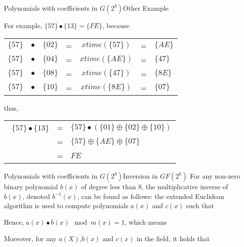 \begin{frame}[t]{Polynomials with coefficients in $G(2^8)$}{Other Example}
	
	For example, $\{57\} \bullet \{13\} = \{FE\}$, because 
	\medskip
	
	
	\begin{center}
		\small
		\begin{tabular}{ccccccl}
			
			$\{57\}$ & $\bullet$ & $\{02\}$ & = &  $xtime(\{57\})$ & = & $\{AE\}$ \\
			$\{57\}$ & $\bullet$ & $\{04\}$ & = &  $xtime(\{AE\})$ & = & $\{47\}$ \\
			$\{57\}$ & $\bullet$ & $\{08\}$ & = &  $xtime(\{47\})$ & = & $\{8E\}$ \\
			$\{57\}$ & $\bullet$ & $\{10\}$ & = &  $xtime(\{8E\})$ & = & $\{07\}$ \\
			
	\end{tabular}\end{center}
	
	thus,
	
	\begin{center}
		\small
		\begin{tabular}{ccl}\
			$\{57\} \bullet \{13\}$ & = &  $\{57\} \bullet (\{01\} \oplus \{02\} \oplus \{10\})$ \\
			& = & $\{57\} \oplus \{AE\} \oplus \{07\}$ \\
			& = &  $FE$ \\
			
	\end{tabular}\end{center}
\end{frame}


\begin{frame}[t]{Polynomials with coefficients in $G(2^8)$}{Inversion in $GF(2^8)$}
	For any non-zero binary polynomial $b(x)$ of degree less than 8, the multiplicative inverse of $b(x)$, denoted $b^{-1}(x)$, can be found as follows: the extended Euclidean algorithm is used to compute polynomials $a(x)$ and $c(x)$ such that \\
	\medskip
	
	
	\medskip
	
	\begin{flushleft}
		Hence, $a(x) \bullet b(x) \mod m(x) = 1$, which means
	\end{flushleft}

	
	
	\medskip
	\begin{flushleft}
		Moreover, for any $a(X) \text{,} b(x) \text{ and } c(x)$ in the field, it holds that
	\end{flushleft}
	
	
\end{frame}

